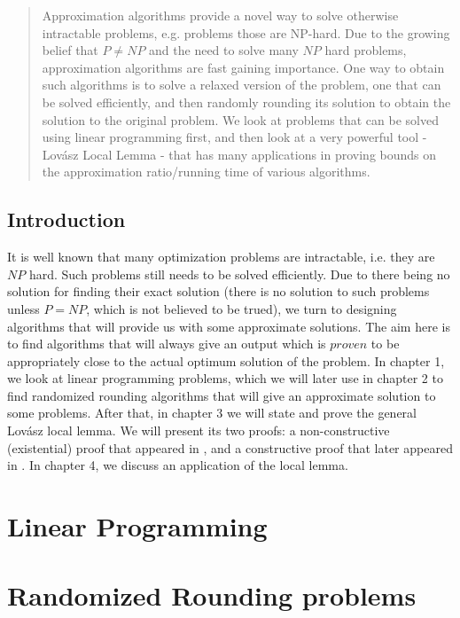 \documentclass[a4paper,10pt]{report}
\begin{document}

\tableofcontents
\begin{abstract}
 Approximation algorithms provide a novel way to solve otherwise intractable problems, e.g. problems those are NP-hard. Due to the growing belief that $P\neq NP$ and the need to solve many $NP$ hard problems, approximation algorithms are fast gaining importance. One way to obtain such algorithms is to solve a relaxed version of the problem, one that can be solved efficiently, and then randomly rounding its solution to obtain the solution to the original problem. We look at problems that can be solved using linear programming first, and then look at a very powerful tool - Lov\'asz Local Lemma - that has many applications in proving bounds on the approximation ratio/running time of various algorithms.
\end{abstract}
\section{Introduction}
It is well known that many optimization problems are intractable, i.e. they are $NP$ hard. Such problems still needs to be solved efficiently. Due to there being no solution for finding their exact solution (there is no solution to such problems unless $P=NP$, which is not believed to be trued), we turn to designing algorithms that will provide us with some approximate solutions. The aim here is to find algorithms that will always give an output which is $proven$ to be appropriately close to the actual optimum solution of the problem. In chapter 1, we look at linear programming problems, which we will later use in chapter 2 to find randomized rounding algorithms that will give an approximate solution to some problems. After that, in chapter 3 we will state and prove the general Lov\'asz local lemma. We will present its two proofs: a non-constructive (existential) proof that appeared in \cite{original},\cite{assym} and a constructive proof that later appeared in \cite{constructive}. In chapter 4, we discuss an application of the local lemma.

\chapter{Linear Programming}

\chapter{Randomized Rounding problems}

\end{document}

